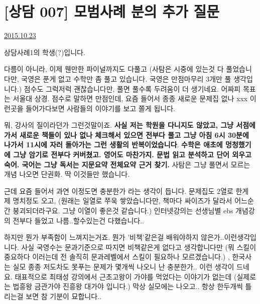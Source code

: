 \section{[상담 007] 모범사례 분의 추가 질문}
\href{https://www.kockoc.com/Apoc/437223}{2015.10.23}

        
    \vspace{5mm}

    상담사례1의 학생(?)입니다.
    \vspace{5mm}

    다름이 아니라, 이제 웬만한 파이널까지도 다풀고 (사탐은 시중에 있는것 다 풀었습니다만, 국영은 푼게 없고 수학만 좀 풀고 있습니다. 국영은 만점마무리 3개만 풀 생각입니다.)  점수도 그럭저럭 괜찮습니다만, 풀면 풀수록 두려움이 더 생기네요.
    어짜피 목표는 서울대 상경. 점수로 말하면 만점인데, 요즘 들어서 종종 새로운 문제집 없나 xxx 이런곳을 들어가다보면 사람들의 이야기를 보고 쫄게 됩니다.
    \vspace{5mm}

    뭐, 강사의 질이라던가 그런것말이죠.
    \textbf{사실 저는 학원을 다니지도 않았고, 그냥 서점에가서 새로운 책들이 있나 없나 체크해서 있으면 전부다 풀고 그냥 아침 6시 30분에 나가서 11시에 자러 돌아가는 그런 생활의 반복이었습니다}. \textbf{수학은 애초에 멍청했기에 그냥 암기로 전부다 커버쳤고. 영어도 마찬가지. 문법 읽고 분석하고 단어 외우고 숙어. 국어는 그냥 독서는 지문요약 전체요약 근거 찾기.} 사탐은 그냥 풀면서 모르는 개념 나오면 단권화. 딱 이것들만 했습니다.
    \vspace{5mm}

    근데 요즘 들어서 과연 이정도면 충분한가 라는 생각이 듭니다. 문제집도 2열로 한게 제 명치정도 오고, (원래는 일열로 쭈욱 쌓았습니다만, 책마다 싸이즈가 달라서 어느순간 붕괴되더라구요. 그냥 이열이 좋은것 같습니다.) 인터넷강의는 선생님별 ebs 개념강의 전부다 들었고 나름..할수있는건 다했습니다..
    \vspace{5mm}

    하지만 뭔가 부족함이 느껴지는거죠. 뭔가 '비책'같은걸 배워야하지 않은가..이런생각입니다. 사실 국영수는 문과기준으로 따지면 비책같은게 없다고 생각합니다만 (뭐 스킬이 중요하다 이러는데 전 솔직히 문과레벨에서 스킬이 필요하나 모르겠습니다.) , 한국사는 실모  종종 저도차도 못푸는 문제가 몇개씩 나오니 난 충분한가.. 이런 생각이 드네요. 태표적으로 최태성 강의에서 근초고왕이 가야를 먹었다는 이야기가 없는데 (실제로는 법흥왕 금관가야 진흥왕 대가야 입니다.) 막상 실모에는 나오고.. 항상 한두개씩 틀리는걸 보면 참 기분이 묘합니다..
    \vspace{5mm}

